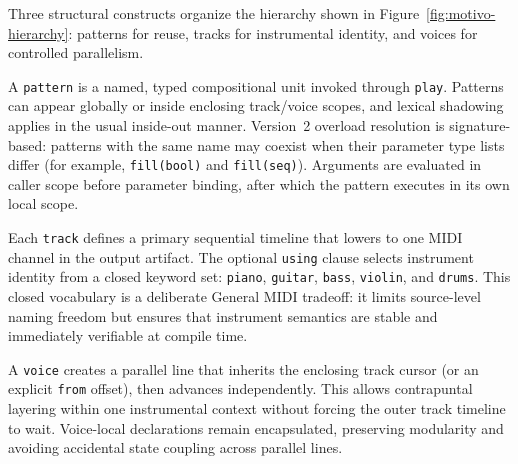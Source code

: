 Three structural constructs organize the hierarchy shown in Figure~\ref{fig:motivo-hierarchy}: patterns for reuse,
tracks for instrumental identity, and voices for controlled parallelism.

A \texttt{pattern} is a named, typed compositional unit invoked through \texttt{play}.
Patterns can appear globally or inside enclosing track/voice scopes, and lexical shadowing applies in the usual
inside-out manner.
Version~2 overload resolution is signature-based: patterns with the same name may coexist when their parameter type
lists differ (for example, \texttt{fill(bool)} and \texttt{fill(seq)}).
Arguments are evaluated in caller scope before parameter binding, after which the pattern executes in its own local
scope.

Each \texttt{track} defines a primary sequential timeline that lowers to one MIDI channel in the output artifact.
The optional \texttt{using} clause selects instrument identity from a closed keyword set:
\texttt{piano}, \texttt{guitar}, \texttt{bass}, \texttt{violin}, and \texttt{drums}.
This closed vocabulary is a deliberate General MIDI tradeoff: it limits source-level naming freedom but ensures that
instrument semantics are stable and immediately verifiable at compile time.

A \texttt{voice} creates a parallel line that inherits the enclosing track cursor (or an explicit \texttt{from}
offset), then advances independently.
This allows contrapuntal layering within one instrumental context without forcing the outer track timeline to wait.
Voice-local declarations remain encapsulated, preserving modularity and avoiding accidental state coupling across
parallel lines.
